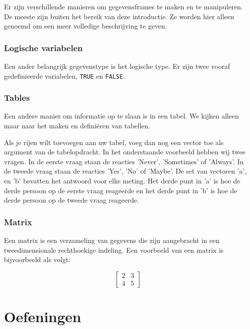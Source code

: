 Er zijn verschillende manieren om gegevensframes te maken en te manipuleren. De meeste zijn buiten het bereik van deze introductie. Ze worden hier alleen genoemd om een meer volledige beschrijving te geven. 



\subsubsection{Logische variabelen}

Een ander belangrijk gegevenstype is het logische type. Er zijn twee vooraf gedefinieerde variabelen, \texttt{TRUE} en \texttt{FALSE}.

\subsubsection{Tables}

Een andere  manier om informatie op te slaan is in een tabel.  We kijken alleen maar naar het maken en defini\"eren van tabellen. 


Als je rijen wilt toevoegen aan uw tabel, voeg dan nog een vector toe als argument van de tabelopdracht. In het onderstaande voorbeeld hebben wij twee vragen. In de eerste vraag staan de reacties  'Never', 'Sometimes' of 'Always'. In de tweede vraag staan de reacties 'Yes', 'No' of 'Maybe'. De set van vectoren 'a', en 'b' bevatten het antwoord voor elke meting. Het derde punt in 'a' is hoe de derde persoon op de eerste vraag reageerde en het derde punt in 'b' is hoe de derde persoon op de tweede vraag reageerde.



\subsubsection{Matrix}

Een matrix is een verzameling van gegevens die zijn aangebracht in een tweedimensionale rechthoekige indeling. Een voorbeeld van een matrix is bijvoorbeeld als volgt:

\[
\begin{bmatrix}
2 & 3 \\ 
4 & 5  
\end{bmatrix}
\]



\section{Oefeningen}

